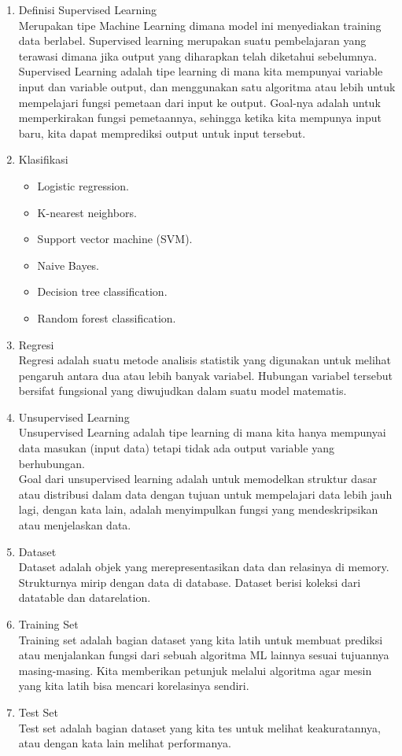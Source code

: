 \begin{enumerate}
\begin{itemize}
\end{itemize}
\item Definisi Supervised Learning\\

Merupakan tipe Machine Learning dimana model ini menyediakan training data berlabel. Supervised learning merupakan suatu pembelajaran yang terawasi dimana jika output yang diharapkan telah diketahui sebelumnya.  Supervised Learning adalah tipe learning di mana kita mempunyai variable input dan variable output, dan menggunakan satu algoritma atau lebih untuk mempelajari fungsi pemetaan dari input ke output. Goal-nya adalah untuk memperkirakan fungsi pemetaannya, sehingga ketika kita mempunya input baru, kita dapat memprediksi output untuk input tersebut.

\item Klasifikasi
\begin{itemize}
\item Logistic regression.
\item K-nearest neighbors.
\item Support vector machine (SVM).
\item Naive Bayes.
\item Decision tree classification.
\item Random forest classification.
\end{itemize}

\item Regresi \\
Regresi adalah suatu metode analisis statistik yang digunakan untuk melihat pengaruh antara dua atau lebih banyak variabel. Hubungan variabel tersebut bersifat fungsional yang diwujudkan dalam suatu model matematis.

\item Unsupervised Learning \\
Unsupervised Learning adalah tipe learning di mana kita hanya mempunyai data masukan (input data) tetapi tidak ada output variable yang berhubungan.\\
Goal dari unsupervised learning adalah untuk memodelkan struktur dasar atau distribusi dalam data dengan tujuan untuk mempelajari data lebih jauh lagi, dengan kata lain, adalah menyimpulkan fungsi yang mendeskripsikan atau menjelaskan data.

\item Dataset \\
Dataset adalah objek yang merepresentasikan data dan relasinya di memory. Strukturnya mirip dengan data di database. Dataset berisi koleksi dari datatable dan datarelation.
\item Training Set \\
Training set adalah bagian dataset yang kita latih untuk membuat prediksi atau menjalankan fungsi dari sebuah algoritma ML lainnya sesuai tujuannya masing-masing. Kita memberikan petunjuk melalui algoritma agar mesin yang kita latih bisa mencari korelasinya sendiri.
\item Test Set \\
Test set adalah bagian dataset yang kita tes untuk melihat keakuratannya, atau dengan kata lain melihat performanya.


\end{enumerate}
